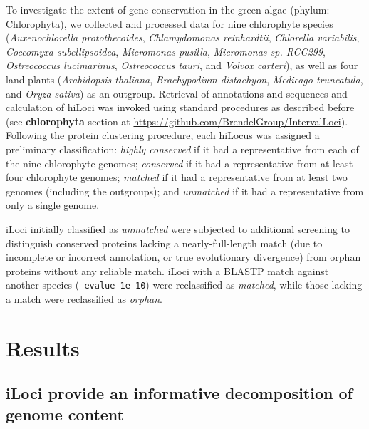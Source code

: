 To investigate the extent of gene conservation in the green algae (phylum: Chlorophyta), we collected and processed data for nine chlorophyte species (\textit{Auxenochlorella protothecoides}, \textit{Chlamydomonas reinhardtii}, \textit{Chlorella variabilis}, \textit{Coccomyxa subellipsoidea}, \textit{Micromonas pusilla}, \textit{Micromonas sp. RCC299}, \textit{Ostreococcus lucimarinus}, \textit{Ostreococcus tauri}, and \textit{Volvox carteri}), as well as four land plants (\textit{Arabidopsis thaliana}, \textit{Brachypodium distachyon}, \textit{Medicago truncatula}, and \textit{Oryza sativa}) as an outgroup.
Retrieval of annotations and sequences and calculation of hiLoci was invoked using standard procedures as described before (see \mbox{\textbf{chlorophyta}} section at \url{https://github.com/BrendelGroup/IntervalLoci}).
Following the protein clustering procedure, each hiLocus was assigned a preliminary classification: \textit{highly conserved} if it had a representative from each of the nine chlorophyte genomes; \textit{conserved} if it had a representative from at least four chlorophyte genomes; \textit{matched} if it had a representative from at least two genomes (including the outgroups); and \textit{unmatched} if it had a representative from only a single genome.

iLoci initially classified as \textit{unmatched} were subjected to additional screening to distinguish conserved proteins lacking a nearly-full-length match (due to incomplete or incorrect annotation, or true evolutionary divergence) from orphan proteins without any reliable match.
iLoci with a BLASTP match against another species (\texttt{-evalue 1e-10}) were reclassified as \textit{matched}, while those lacking a match were reclassified as \textit{orphan}.










\section{Results}

\subsection{iLoci provide an informative decomposition of genome content}

